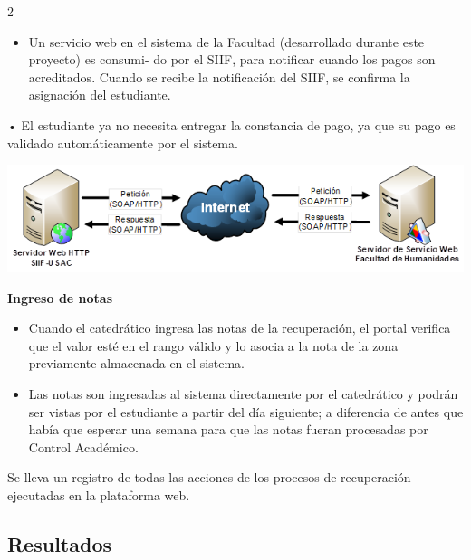 \documentclass[12pt,spanish,Letterpaper,openany]{book}
\providecommand{\tightlist}{%
  \setlength{\itemsep}{0pt}\setlength{\parskip}{0pt}}
\begin{document}
\begin {multicols}{2}
\begin{itemize}
\tightlist
\item
  Un servicio web en el sistema de la Facultad (desarrollado durante este proyecto) es consumi-
  do por el SIIF, para notificar cuando los pagos son acreditados. Cuando se recibe la notificación del SIIF, se confirma la asignación del estudiante.
\end{itemize}

• El estudiante ya no necesita entregar la constancia de pago, ya que su pago es validado automáticamente por el sistema.

\begin {flushleft}
\noindent\begin{minipage}[c]{\columnwidth}

\includegraphics[width=1\linewidth]{images/image04_rherrera}

\end{minipage}

\end {flushleft}

\textbf{Ingreso de notas}

\begin{itemize}
\item
  Cuando el catedrático ingresa las notas de la recuperación, el portal verifica que el valor esté en el rango válido y lo asocia a la nota de la zona previamente almacenada en el sistema.
\item
  Las notas son ingresadas al sistema directamente por el catedrático y podrán ser vistas por el estudiante a partir del día siguiente; a diferencia de antes que había que esperar una semana para que las notas fueran procesadas por Control Académico.
\end{itemize}

Se lleva un registro de todas las acciones de los procesos de recuperación ejecutadas en la plataforma web.

\hypertarget{resultados}{%
\subsection{Resultados}\label{resultados}}


\end{multicols}
\end{document}
